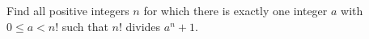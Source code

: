 Find all positive integers $n$ for which there is exactly one integer $a$ with $0\le a<n!$ such that $n!$ divides $a^n+1$.
